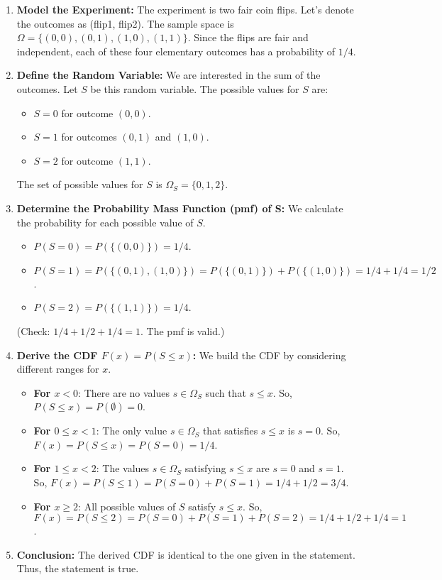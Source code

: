 \documentclass[11pt,a4paper]{article}
\begin{document}
\begin{enumerate}
    \item \textbf{Model the Experiment:}
    The experiment is two fair coin flips. Let's denote the outcomes as (flip1, flip2). The sample space is $\Omega = \{(0,0), (0,1), (1,0), (1,1)\}$. Since the flips are fair and independent, each of these four elementary outcomes has a probability of $1/4$.

    \item \textbf{Define the Random Variable:} We are interested in the sum of the outcomes. Let $S$ be this random variable. The possible values for $S$ are:
    \begin{itemize}
        \item $S=0$ for outcome $(0,0)$.
        \item $S=1$ for outcomes $(0,1)$ and $(1,0)$.
        \item $S=2$ for outcome $(1,1)$.
    \end{itemize}
    The set of possible values for $S$ is $\Omega_S = \{0, 1, 2\}$.

    \item \textbf{Determine the Probability Mass Function (pmf) of S:}
    We calculate the probability for each possible value of $S$.
    \begin{itemize}
        \item $P(S=0) = P(\{(0,0)\}) = 1/4$.
        \item $P(S=1) = P(\{(0,1), (1,0)\}) = P(\{(0,1)\}) + P(\{(1,0)\}) = 1/4 + 1/4 = 1/2$.
        \item $P(S=2) = P(\{(1,1)\}) = 1/4$.
    \end{itemize}
    (Check: $1/4 + 1/2 + 1/4 = 1$. The pmf is valid.)

    \item \textbf{Derive the CDF $F(x) = P(S \le x)$:} We build the CDF by considering different ranges for $x$.
    \begin{itemize}
        \item \textbf{For $x < 0$}: There are no values $s \in \Omega_S$ such that $s \le x$. So, $P(S \le x) = P(\emptyset) = 0$.
        \item \textbf{For $0 \le x < 1$}: The only value $s \in \Omega_S$ that satisfies $s \le x$ is $s=0$. So, $F(x) = P(S \le x) = P(S=0) = 1/4$.
        \item \textbf{For $1 \le x < 2$}: The values $s \in \Omega_S$ satisfying $s \le x$ are $s=0$ and $s=1$. So, $F(x) = P(S \le 1) = P(S=0) + P(S=1) = 1/4 + 1/2 = 3/4$.
        \item \textbf{For $x \ge 2$}: All possible values of $S$ satisfy $s \le x$. So, $F(x) = P(S \le 2) = P(S=0) + P(S=1) + P(S=2) = 1/4 + 1/2 + 1/4 = 1$.
    \end{itemize}

    \item \textbf{Conclusion:} The derived CDF is identical to the one given in the statement. Thus, the statement is true.
\end{enumerate}
\end{document}
